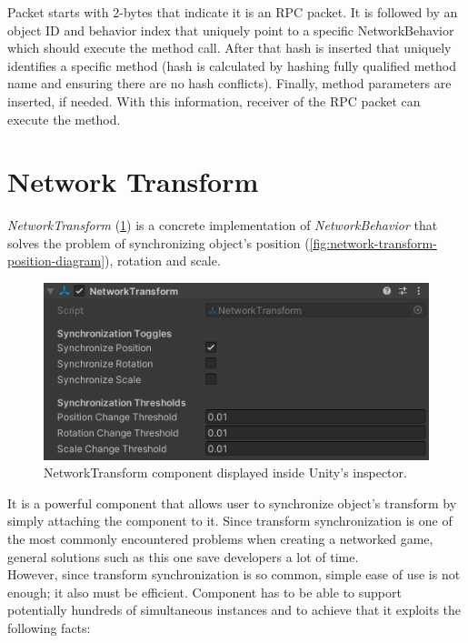 \documentclass[times, utf8, diplomski]{fer}
\begin{document}
Packet starts with 2-bytes that indicate it is an RPC packet. It is followed by an object ID and behavior index that uniquely point to a specific NetworkBehavior which should execute the method call. After that hash is inserted that uniquely identifies a specific method (hash is calculated by hashing fully qualified method name and ensuring there are no hash conflicts). Finally, method parameters are inserted, if needed. With this information, receiver of the RPC packet can execute the method.

\section{Network Transform}
\textit{NetworkTransform} (\ref{fig:network-transform-inspector}) is a concrete implementation of \textit{NetworkBehavior} that solves the problem of synchronizing object's position (\ref{fig:network-transform-position-diagram}), rotation and scale.

\begin{figure}[H]
	\centering
	\includegraphics[scale=1.1]{NetworkTransform-inspector}
	\caption{NetworkTransform component displayed inside Unity's inspector.}
	\label{fig:network-transform-inspector}
\end{figure}

It is a powerful component that allows user to synchronize object's transform by simply attaching the component to it. Since transform synchronization is one of the most commonly encountered problems when creating a networked game, general solutions such as this one save developers a lot of time.\\

However, since transform synchronization is so common, simple ease of use is not enough; it also must be efficient. Component has to be able to support potentially hundreds of simultaneous instances and to achieve that it exploits the following facts:
\end{document}
